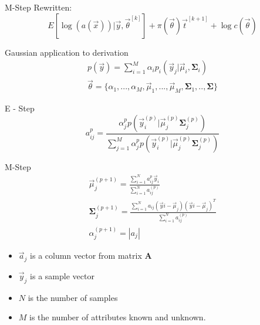 \documentclass[11pt]{article}
\begin{document}
M-Step Rewritten:
\begin{equation}
E [ \log (a (\vec{x})) | \vec{y} , \vec{\theta}^{[k]}] + \pi (\vec{\theta}) \vec{t}^{[k+1]} + \log c(\vec{\theta})
\end{equation}



Gaussian application to derivation
\begin{eqnarray}
p(\vec{y}) = \sum _{i=1} ^M \alpha_i p_i (\vec{y}_j | \vec{\mu}_i, \mathbf{\Sigma}_i) \\
\vec{\theta} = \{\alpha_1, ..., \alpha_M, \vec{\mu}_1, ..., \vec{\mu}_M, \mathbf{\Sigma}_1, .., \mathbf{\Sigma} \} 
\end{eqnarray}

E - Step 
\begin{equation}
	a_{ij}^p = \frac {\alpha_j ^p p(\vec{y}_i ^{(p)} | \vec{\mu}_j ^{(p)} \mathbf{\Sigma}_j ^{(p)}) }{ \sum_{j=1}^M \alpha_j ^p p ( \vec{y}_i ^{(p)} | \vec{\mu}_j ^{(p)} \mathbf{\Sigma}_j ^{(p)} )  }
\end{equation}

M-Step
\begin{eqnarray}
\vec{\mu}_j ^{(p+1)}  =   \frac{ \sum_{i=1}^N a_{ij}^p \vec{y}_i }{\sum _{i=1}^N a_{ij}^{(p)} } \\
\mathbf{\Sigma}_j ^{(p+1)}  = \frac{\sum _{i=1}^N a_{ij} ( \vec{y}i - \vec{\mu}_j)( \vec{y}i - \vec{\mu}_j)^T}{\sum_{i=1}^N a_{ij} ^{(p)}} \\
\alpha_j ^{(p+1)} = | a_j |
\end{eqnarray}


\begin{itemize}
	\item $\vec{a}_j$ is a column vector from matrix $\mathbf{A}$
	\item $\vec{y}_j$ is a sample vector 
	\item $N$ is the number of samples
	\item $M$ is the number of attributes known and unknown.
\end{itemize}





\end{document}
